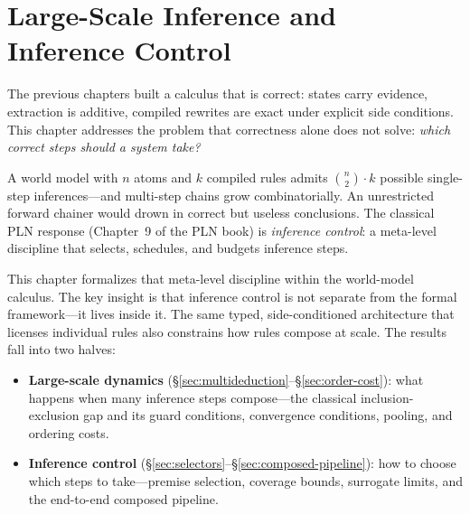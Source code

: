 \documentclass[11pt,openany]{report}
\begin{document}


\chapter{Large-Scale Inference and Inference Control}
\label{ch:scale-control}

The previous chapters built a calculus that is correct: states carry
evidence, extraction is additive, compiled rewrites are exact under
explicit side conditions.  This chapter addresses the problem that
correctness alone does not solve: \emph{which correct steps should a
system take?}

A world model with $n$ atoms and $k$ compiled rules admits
$\binom{n}{2} \cdot k$ possible single-step inferences---and
multi-step chains grow combinatorially.  An unrestricted forward
chainer would drown in correct but useless conclusions.  The
classical PLN response (Chapter~9 of the PLN book) is
\emph{inference control}: a meta-level discipline that selects,
schedules, and budgets inference steps.

This chapter formalizes that meta-level discipline within the
world-model calculus.  The key insight is that inference control is
not separate from the formal framework---it lives inside it.  The
same typed, side-conditioned architecture that licenses individual
rules also constrains how rules compose at scale.  The results fall
into two halves:

\begin{itemize}
\item \textbf{Large-scale dynamics} (\S\ref{sec:multideduction}--\S\ref{sec:order-cost}): what happens when
  many inference steps compose---the classical inclusion-exclusion
  gap and its guard conditions,
  convergence conditions, pooling, and ordering costs.
\item \textbf{Inference control}
  (\S\ref{sec:selectors}--\S\ref{sec:composed-pipeline}): how to
  choose which steps to take---premise selection, coverage bounds,
  surrogate limits, and the end-to-end composed pipeline.
\end{itemize}
\end{document}

